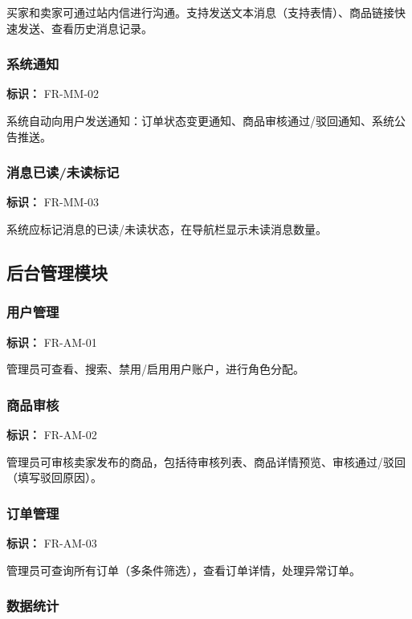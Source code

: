 \documentclass[12pt,a4paper,UTF8]{ctexart}
\begin{document}
买家和卖家可通过站内信进行沟通。支持发送文本消息（支持表情）、商品链接快速发送、查看历史消息记录。

\subsubsection{系统通知}

\textbf{标识：} FR-MM-02

系统自动向用户发送通知：订单状态变更通知、商品审核通过/驳回通知、系统公告推送。

\subsubsection{消息已读/未读标记}

\textbf{标识：} FR-MM-03

系统应标记消息的已读/未读状态，在导航栏显示未读消息数量。

\subsection{后台管理模块}

\subsubsection{用户管理}

\textbf{标识：} FR-AM-01

管理员可查看、搜索、禁用/启用用户账户，进行角色分配。

\subsubsection{商品审核}

\textbf{标识：} FR-AM-02

管理员可审核卖家发布的商品，包括待审核列表、商品详情预览、审核通过/驳回（填写驳回原因）。

\subsubsection{订单管理}

\textbf{标识：} FR-AM-03

管理员可查询所有订单（多条件筛选），查看订单详情，处理异常订单。

\subsubsection{数据统计}
\end{document}
